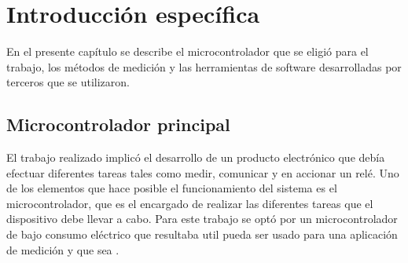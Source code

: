 \chapter{Introducción específica} %

\label{Chapter2}

%
%


En el presente capítulo se describe el microcontrolador que se eligió para el trabajo, los métodos de medición y las herramientas de software desarrolladas por terceros que se utilizaron.

\section{Microcontrolador principal}
\label{sec:cap2parte1}


El trabajo realizado implicó el desarrollo de un producto electrónico que debía efectuar diferentes tareas tales como medir, comunicar y en accionar un relé. Uno de los elementos que hace posible el funcionamiento del sistema es el microcontrolador, que es el encargado de realizar las diferentes tareas que el dispositivo debe llevar a cabo. Para este trabajo se optó por un microcontrolador de bajo consumo eléctrico que resultaba util  pueda ser usado para una aplicación de medición y que sea . 

